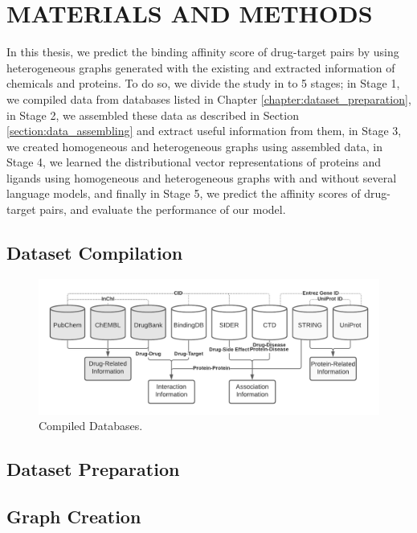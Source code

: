 \chapter{MATERIALS AND METHODS}
In this thesis, we predict the binding affinity score of drug-target pairs by using heterogeneous graphs generated with the existing and extracted information of chemicals and proteins. To do so, we divide the study in to 5 stages; in Stage 1, we compiled data from databases listed in Chapter \ref{chapter:dataset_preparation}, in Stage 2, we assembled these data as described in Section \ref{section:data_assembling} and extract useful information from them, in Stage 3, we created homogeneous and heterogeneous graphs using assembled data, in Stage 4, we learned the distributional vector representations of proteins and ligands using homogeneous and heterogeneous graphs with and without several language models, and finally in Stage 5, we predict the affinity scores of drug-target pairs, and  evaluate the performance of our model.

\section{Dataset Compilation}
\begin{figure}
    \centering
        \includegraphics[width=\linewidth]{chapters/materials_and_methods/figures/databases.png}
    \caption{Compiled Databases.}
    \label{fig:databases}
\end{figure}

\section{Dataset Preparation}

\section{Graph Creation}

